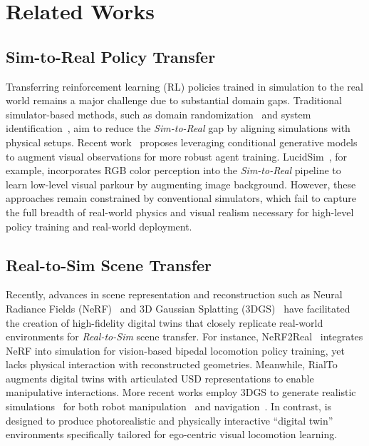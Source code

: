 \section{Related Works}
\label{sec:related_works}
\subsection{Sim-to-Real Policy Transfer} 
Transferring reinforcement learning (RL) policies trained in simulation to the real world remains a major challenge due to substantial domain gaps. Traditional simulator-based methods, such as domain randomization~\cite{gensim, dynamic_random, domain, dynamics_revisit, cad2rl, synthetic} and system identification~\cite{dynamic_motor, agile_loco, dexterous, closing}, aim to reduce the \textit{Sim-to-Real} gap by aligning simulations with physical setups. Recent work~\cite{layout, drivedreamer, semantically, scaling} proposes leveraging conditional generative models to augment visual observations for more robust agent training. LucidSim~\cite{lucidsim}, for example, incorporates RGB color perception into the \textit{Sim-to-Real} pipeline to learn low-level visual parkour by augmenting image background. However, these approaches remain constrained by conventional simulators, which fail to capture the full breadth of real-world physics and visual realism necessary for high-level policy training and real-world deployment.

\subsection{Real-to-Sim Scene Transfer} 
Recently, advances in scene representation and reconstruction such as Neural Radiance Fields (NeRF)~\cite{nerf} and 3D Gaussian Splatting (3DGS)~\cite{3dgs} have facilitated the creation of high-fidelity digital twins that closely replicate real-world environments for \textit{Real-to-Sim} scene transfer. For instance, NeRF2Real~\cite{nerf2real} integrates NeRF into simulation for vision-based bipedal locomotion policy training, yet lacks physical interaction with reconstructed geometries. Meanwhile, RialTo~\cite{reconciling} augments digital twins with articulated USD representations to enable manipulative interactions. More recent works employ 3DGS to generate realistic simulations~\cite{discoverse2024} for both robot manipulation~\cite{robogs, robogsim, splatsim, rl-gsbrige} and navigation~\cite{quach2024gaussian,vid2sim}. In contrast, \themodel is designed to produce photorealistic and physically interactive “digital twin” environments specifically tailored for ego-centric visual locomotion learning.